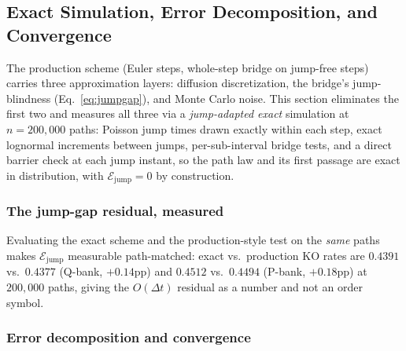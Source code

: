 \documentclass[11pt,a4paper]{article}
\begin{document}
\subsection{Exact Simulation, Error Decomposition, and Convergence}
\label{sec:rigor}

The production scheme (Euler steps, whole-step bridge on jump-free steps) carries three approximation layers: diffusion discretization, the bridge's jump-blindness (Eq.~\ref{eq:jumpgap}), and Monte Carlo noise. This section eliminates the first two and measures all three via a \emph{jump-adapted exact} simulation at $n=200{,}000$ paths: Poisson jump times drawn exactly within each step, exact lognormal increments between jumps, per-sub-interval bridge tests, and a direct barrier check at each jump instant, so the path law and its first passage are exact in distribution, with $\mathcal E_{\mathrm{jump}}=0$ by construction.

\subsubsection{The jump-gap residual, measured}
\label{sec:ejumpmeasured}

Evaluating the exact scheme and the production-style test on the \emph{same} paths makes $\mathcal E_{\mathrm{jump}}$ measurable path-matched: exact vs.\ production KO rates are $0.4391$ vs.\ $0.4377$ (Q-bank, $+0.14$pp) and $0.4512$ vs.\ $0.4494$ (P-bank, $+0.18$pp) at $200{,}000$ paths, giving the $O(\Delta t)$ residual as a number and not an order symbol.

\subsubsection{Error decomposition and convergence}
\label{sec:errdecomp}
\end{document}
